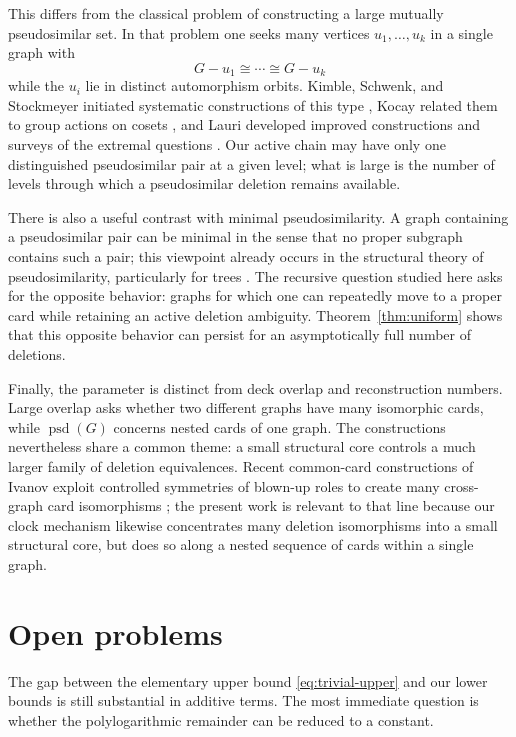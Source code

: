 \documentclass[11pt]{article}
\theoremstyle{definition}
\theoremstyle{remark}
\newcommand{\psd}{\operatorname{psd}}
\begin{document}
This differs from the classical problem of constructing a large mutually pseudosimilar set. In that problem one seeks many vertices $u_1,\ldots,u_k$ in a single graph with
\[
    G-u_1\cong\cdots\cong G-u_k
\]
while the $u_i$ lie in distinct automorphism orbits. Kimble, Schwenk, and Stockmeyer initiated systematic constructions of this type \cite{KimbleSchwenkStockmeyer1981}, Kocay related them to group actions on cosets \cite{Kocay1984}, and Lauri developed improved constructions and surveys of the extremal questions \cite{Lauri1996,Lauri1997,Lauri2003}. Our active chain may have only one distinguished pseudosimilar pair at a given level; what is large is the number of levels through which a pseudosimilar deletion remains available.

There is also a useful contrast with minimal pseudosimilarity. A graph containing a pseudosimilar pair can be minimal in the sense that no proper subgraph contains such a pair; this viewpoint already occurs in the structural theory of pseudosimilarity, particularly for trees \cite{HararyPalmer1966,KirkpatrickKlaweCorneil1983}. The recursive question studied here asks for the opposite behavior: graphs for which one can repeatedly move to a proper card while retaining an active deletion ambiguity. Theorem~\ref{thm:uniform} shows that this opposite behavior can persist for an asymptotically full number of deletions.

Finally, the parameter is distinct from deck overlap and reconstruction numbers. Large overlap asks whether two different graphs have many isomorphic cards, while $\psd(G)$ concerns nested cards of one graph. The constructions nevertheless share a common theme: a small structural core controls a much larger family of deletion equivalences. Recent common-card constructions of Ivanov exploit controlled symmetries of blown-up roles to create many cross-graph card isomorphisms \cite{Ivanov2026}; the present work is relevant to that line because our clock mechanism likewise concentrates many deletion isomorphisms into a small structural core, but does so along a nested sequence of cards within a single graph.

\section{Open problems}

The gap between the elementary upper bound \eqref{eq:trivial-upper} and our lower bounds is still substantial in additive terms. The most immediate question is whether the polylogarithmic remainder can be reduced to a constant.
\end{document}
